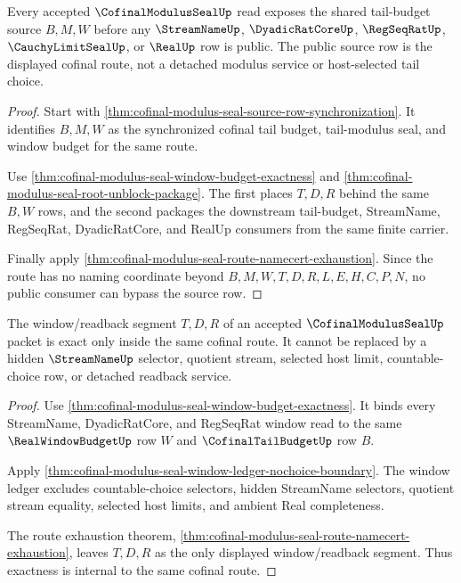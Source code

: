 \begin{theorem}
\label{thm:cofinal-modulus-seal-tail-budget-row}
Every accepted $\CofinalModulusSealUp$ read exposes the shared tail-budget source $B,M,W$ before any $\StreamNameUp$, $\DyadicRatCoreUp$, $\RegSeqRatUp$, $\CauchyLimitSealUp$, or $\RealUp$ row is public. The public source row is the displayed cofinal route, not a detached modulus service or host-selected tail choice.
\end{theorem}
\begin{proof}
Start with \autoref{thm:cofinal-modulus-seal-source-row-synchronization}. It identifies $B,M,W$ as the synchronized cofinal tail budget, tail-modulus seal, and window budget for the same route.

Use \autoref{thm:cofinal-modulus-seal-window-budget-exactness} and \autoref{thm:cofinal-modulus-seal-root-unblock-package}. The first places $T,D,R$ behind the same $B,W$ rows, and the second packages the downstream tail-budget, StreamName, RegSeqRat, DyadicRatCore, and RealUp consumers from the same finite carrier.

Finally apply \autoref{thm:cofinal-modulus-seal-route-namecert-exhaustion}. Since the route has no naming coordinate beyond $B,M,W,T,D,R,L,E,H,C,P,N$, no public consumer can bypass the source row.
\end{proof}

\begin{theorem}
\label{thm:cofinal-modulus-seal-window-readback-row}
The window/readback segment $T,D,R$ of an accepted $\CofinalModulusSealUp$ packet is exact only inside the same cofinal route. It cannot be replaced by a hidden $\StreamNameUp$ selector, quotient stream, selected host limit, countable-choice row, or detached readback service.
\end{theorem}
\begin{proof}
Use \autoref{thm:cofinal-modulus-seal-window-budget-exactness}. It binds every StreamName, DyadicRatCore, and RegSeqRat window read to the same $\RealWindowBudgetUp$ row $W$ and $\CofinalTailBudgetUp$ row $B$.

Apply \autoref{thm:cofinal-modulus-seal-window-ledger-nochoice-boundary}. The window ledger excludes countable-choice selectors, hidden StreamName selectors, quotient stream equality, selected host limits, and ambient Real completeness.

The route exhaustion theorem, \autoref{thm:cofinal-modulus-seal-route-namecert-exhaustion}, leaves $T,D,R$ as the only displayed window/readback segment. Thus exactness is internal to the same cofinal route.
\end{proof}

